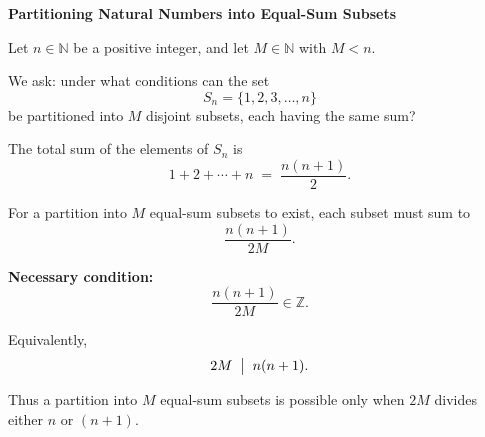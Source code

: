 \documentclass[12pt]{article}
\begin{document}
\textbf{Partitioning Natural Numbers into Equal-Sum Subsets}

Let $n \in \mathbb{N}$ be a positive integer, and let $M \in \mathbb{N}$ with $M < n$.

We ask: under what conditions can the set
\[
S_n = \{1, 2, 3, \dots, n\}
\]
be partitioned into $M$ disjoint subsets, each having the same sum?

\medskip

The total sum of the elements of $S_n$ is
\[
1 + 2 + \cdots + n \;=\; \frac{n(n+1)}{2}.
\]

For a partition into $M$ equal-sum subsets to exist, each subset must sum to
\[
\frac{n(n+1)}{2M}.
\]

\medskip

\noindent \textbf{Necessary condition:}  
\[
\frac{n(n+1)}{2M} \in \mathbb{Z}.
\]

Equivalently,
\[
2M \;\bigm|\; n(n+1).
\]

Thus a partition into $M$ equal-sum subsets is possible only when $2M$ divides either $n$ or $(n+1)$.
\end{document}
